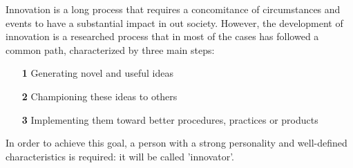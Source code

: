 Innovation is a long process that requires a concomitance of circumstances and events to have a substantial impact in out society. However, the development of innovation is a researched process that in most of the cases has followed a common path, characterized by three main steps:
\begin{enumerate}
	\item[\textbf{1}] Generating novel and useful ideas
	\item[\textbf{2}] Championing these ideas to others
	\item[\textbf{3}] Implementing them toward better procedures, practices or products
\end{enumerate}
In order to achieve this goal, a person with a strong personality and well-defined characteristics is required: it will be called 'innovator'.

